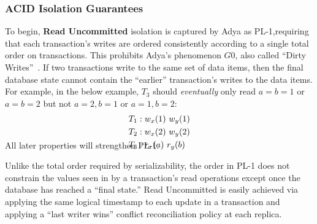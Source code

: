 \subsubsection{ACID Isolation Guarantees}

To begin, \textbf{Read Uncommitted} isolation is captured by Adya as
PL-1,requiring that each transaction's writes are ordered consistently
according to a single total order on transactions. This prohibits
Adya's phenomenon $G0$, also called ``Dirty Writes''~\cite{adya}. If
two transactions write to the same set of data items, then the final
database state cannot contain the ``earlier'' transaction's writes to
the data items. For example, in the below example, $T_3$ should
\emph{eventually} only read $a=b=1$ or $a=b=2$ but not $a=2, b=1$ or
$a=1, b=2$:
\begin{align*}
\small
T_1 &: w_x(1)~w_y(1)
\\T_2 &: w_x(2)~w_y(2)
\\T_3 &: r_x(a)~r_y(b)\\[-2em]
\end{align*}
All later properties will strengthen PL-1.

Unlike the total order required by serializability, the order in PL-1
does not constrain the values seen in by a transaction's read
operations except once the database has reached a ``final
state.'' Read Uncommitted is easily achieved via applying the same
logical timestamp to each update in a transaction and applying a
``last writer wins'' conflict reconciliation policy at each replica.

